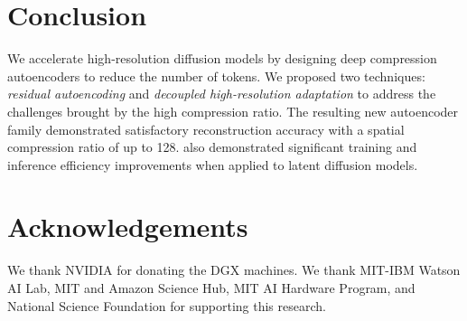 \vspace{-5pt}
\section{Conclusion}\label{sec:conclusion}
\vspace{-5pt}
We accelerate high-resolution diffusion models by designing deep compression autoencoders to reduce the number of tokens. We proposed two techniques: \textit{residual autoencoding} and \textit{decoupled high-resolution adaptation} to address the challenges brought by the high compression ratio. The resulting new autoencoder family \modelshort demonstrated satisfactory reconstruction accuracy with a spatial compression ratio of up to 128. \modelshort also demonstrated significant training and inference efficiency improvements when applied to latent diffusion models. 

\section*{Acknowledgements}
We thank NVIDIA for donating the DGX machines. We thank MIT-IBM Watson AI Lab, MIT and Amazon Science Hub, MIT AI Hardware Program, and National Science Foundation for supporting this research. 
